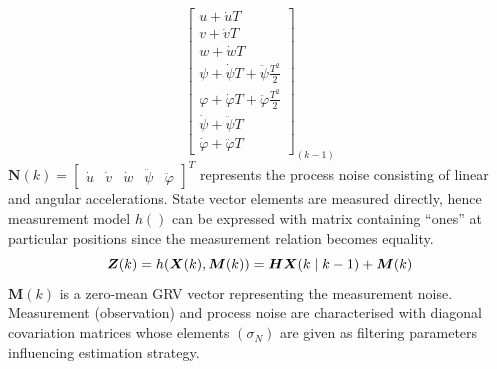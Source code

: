 \documentclass[portrait,final,a0paper]{baposter}
\newcommand{\vect}[1]{\boldsymbol{#1}}
\begin{document}
\begin{poster}
{\begin{equation}
\begin{bmatrix}
                u + \dot{u}T \\ 
                v + \dot{v}T \\ 
                w + \dot{w}T \\ 
                \psi    + \dot{\psi}T    + \ddot{\psi}   \frac{T^{2}}{2} \\ 
                \varphi + \dot{\varphi}T + \ddot{\varphi}\frac{T^{2}}{2} \\ 
                \dot{\psi}    + \ddot{\psi}T \\ 
                \dot{\varphi} + \ddot{\varphi}T
\end{bmatrix}_{(k-1)} 
\label{eq:state-tran-matrix}
\end{equation} %
	$\vect{N}(k) = \left[ \begin{array}{ccccc} \dot{u} & \dot{v} & \dot{w} & \ddot{\psi} & \ddot{\varphi} \end{array} \right]^{T}$ represents the process noise consisting of linear and angular accelerations. State vector elements are measured directly, hence measurement model $h()$ can be expressed with matrix containing ``ones'' at particular positions since the measurement relation becomes equality.
\begin{equation}
\vspace{-5pt}
\vect{Z}(k) = h(\vect{X}(k), \vect{M}(k)) = \vect{H} \vect{X}(k \mid k-1)  + \vect{M}(k)
\label{eq:mes-model}
\end{equation}
	$\vect{M}(k)$ is a zero-mean GRV vector representing the measurement noise. Measurement (observation) and process noise are characterised with diagonal covariation matrices whose elements $(\sigma_{N})$ are given as filtering parameters influencing estimation strategy.
  \vspace{0.3em}
  }
\end{poster}
\end{document}
